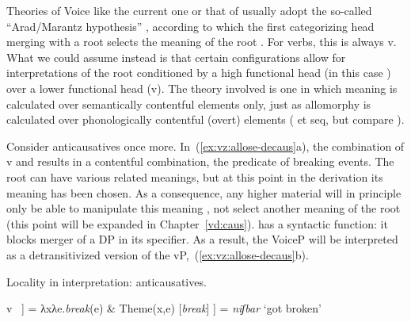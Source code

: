 \begin{exe}
\begin{xlist}
\begin{xlist}
\begin{exe}
\begin{xlist}
\begin{xlist}
\begin{exe}
\begin{xlist}
\begin{xlist}
\begin{exe}
\begin{exe}
\begin{xlist}
\begin{exe}
\begin{exe}
\begin{xlist}
\begin{exe}
\begin{exe}
\begin{exe}
\begin{exe}
\begin{exe}
\begin{xlist}
\begin{exe}
\begin{xlist}
\begin{exe}
\begin{exe}
\begin{xlist}
\begin{exe}
\begin{xlist}
\begin{exe}
\begin{xlist}
\begin{exe}
\begin{exe}
\begin{exe}
\begin{xlist}
\begin{exe}
\begin{exe}
Theories of Voice like the current one or that of \cite{layering15} usually adopt the so-called ``Arad/Marantz hypothesis'' \citep{elenasamioti14}, according to which the first categorizing head merging with a root selects the meaning of the root \citep{arad03,marantz13}. For verbs, this is always v. What we could assume instead is that certain configurations allow for interpretations of the root conditioned by a high functional head (in this case {\vz}) over a lower functional head (v). The theory involved is one in which meaning is calculated over semantically contentful elements only, just as allomorphy is calculated over phonologically contentful (overt) elements (\citealt{embick10} et seq, but compare \citealt{kastnermoskal18}).

Consider anticausatives once more. In~(\ref{ex:vz:allose-decaus}a), the combination of v and  results in a contentful combination, the predicate of breaking events. The root can have various related meanings, but at this point in the derivation its meaning has been chosen. As a consequence, any higher material will in principle only be able to manipulate this meaning \citep{arad03}, not select another meaning of the root (this point will be expanded in Chapter~\ref{vd:caus}). {\vz} has a syntactic function: it blocks merger of a DP in its specifier. As a result, the VoiceP will be interpreted as a detransitivized version of the vP,~(\ref{ex:vz:allose-decaus}b).

 \begin{exe}
 \ex  Locality in interpretation: anticausatives.\label{ex:vz:allose-decaus} 
 \begin{xlist} 
     \ex  {[}v ~\!] = λxλe.\emph{break}(e) \& Theme(x,e) 
     \ex  {[}\textbf{\vz} [\emph{break}] ] = \emph{niʃbar} `got broken' 
 \z
\z 


\end{xlist}
\end{exe}
\end{exe}
\end{exe}
\end{xlist}
\end{exe}
\end{exe}
\end{exe}
\end{xlist}
\end{exe}
\end{xlist}
\end{exe}
\end{xlist}
\end{exe}
\end{exe}
\end{xlist}
\end{exe}
\end{xlist}
\end{exe}
\end{exe}
\end{exe}
\end{exe}
\end{exe}
\end{xlist}
\end{exe}
\end{exe}
\end{xlist}
\end{exe}
\end{exe}
\end{xlist}
\end{xlist}
\end{exe}
\end{xlist}
\end{xlist}
\end{exe}
\end{xlist}
\end{xlist}
\end{exe}
